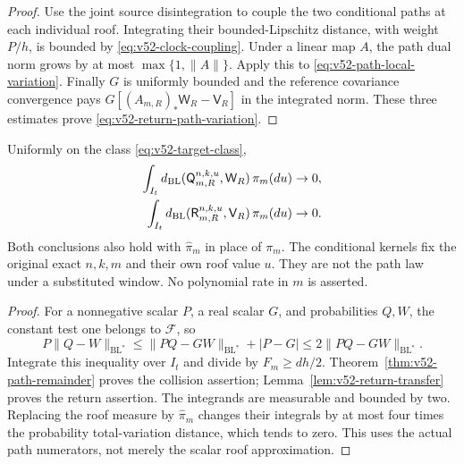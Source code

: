 \begin{proof}
Use the joint source disintegration to couple the two conditional
paths at each individual roof. Integrating their bounded-Lipschitz
distance, with weight $P/h$, is bounded by
\eqref{eq:v52-clock-coupling}. Under a linear map $A$, the path dual
norm grows by at most $\max\{1,\|A\|\}$. Apply this to
\eqref{eq:v52-path-local-variation}. Finally $G$ is uniformly bounded
and the reference covariance convergence pays
$G[(A_{m,R})_*\mathsf W_R-\mathsf V_R]$ in the integrated norm.
These three estimates prove \eqref{eq:v52-return-path-variation}.
\end{proof}

\begin{theorem}
\label{thm:v52-same-roof-mean}
Uniformly on the class \eqref{eq:v52-target-class},
\begin{align}
 \int_{I_t}d_{\rm BL}(\mathsf Q_{m,R}^{n,k,u},\mathsf W_R)
                                                   \,\pi_m(du)&\to0,
                                             \label{eq:v52-collision-kernel-mean}\\
 \int_{I_t}d_{\rm BL}(\mathsf R_{m,R}^{n,k,u},\mathsf V_R)
                                                   \,\pi_m(du)&\to0.
                                             \label{eq:v52-return-kernel-mean}
\end{align}
Both conclusions also hold with $\widehat\pi_m$ in place of $\pi_m$.
The conditional kernels fix the original exact $n,k,m$ and their own
roof value $u$. They are not the path law under a substituted window.
No polynomial rate in $m$ is asserted.
\end{theorem}
\begin{proof}
For a nonnegative scalar $P$, a real scalar $G$, and probabilities
$Q,W$, the constant test one belongs to $\mathcal F$, so
\[
 P\|Q-W\|_{\mathrm{BL}^*}
 \le\|PQ-GW\|_{\mathrm{BL}^*}+|P-G|
 \le2\|PQ-GW\|_{\mathrm{BL}^*}.
\]
Integrate this inequality over $I_t$ and divide by $F_m\ge dh/2$.
Theorem~\ref{thm:v52-path-remainder} proves the collision assertion;
Lemma~\ref{lem:v52-return-transfer} proves the return assertion.
The integrands are measurable and bounded by two. Replacing the
roof measure by $\widehat\pi_m$ changes their integrals by at most
four times the probability total-variation distance, which tends
to zero. This uses the actual path numerators, not merely the
scalar roof approximation.
\end{proof}

